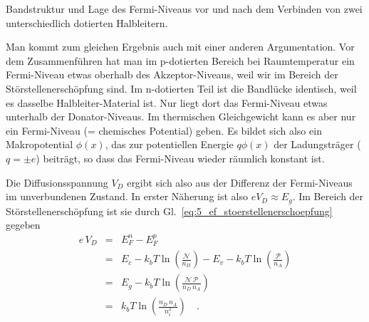 \begin{marginfigure}
    \caption{Bandstruktur und Lage des Fermi-Niveaus vor und nach dem Verbinden  von zwei unterschiedlich dotierten Halbleitern.}
\end{marginfigure}

Man kommt zum gleichen Ergebnis auch mit einer anderen Argumentation. Vor dem Zusammenführen hat man im p-dotierten Bereich bei Raumtemperatur ein Fermi-Niveau etwas oberhalb des Akzeptor-Niveaus, weil wir im Bereich der Störstellenerschöpfung sind. Im n-dotierten Teil ist die Bandlücke identisch, weil es dasselbe Halbleiter-Material ist. Nur liegt dort das Fermi-Niveau  etwas unterhalb der Donator-Niveaus. Im thermischen Gleichgewicht kann es aber nur ein Fermi-Niveau (= chemisches Potential) geben. Es bildet sich also ein Makropotential $\phi(x)$, das zur potentiellen Energie $q \phi(x)$ der Ladungsträger ($q = \pm e$) beiträgt, so dass das Fermi-Niveau wieder räumlich konstant ist. 


Die Diffusionsspannung $V_D$ ergibt sich also aus der Differenz der Fermi-Niveaus im unverbundenen Zustand. In erster Näherung ist also $e V_D \approx E_g$. Im Bereich der Störstellenerschöpfung ist sie durch Gl.~\ref{eq:5_ef_stoerstellenerschoepfung} gegeben
\begin{eqnarray}
    e \, V_D &= & E_F^n - E_F^p \\
    & =&   E_c - k_b T \ln \left( \frac{\mathcal{N}}{n_D} \right) - 
    E_v - k_b T \ln \left( \frac{\mathcal{P}}{n_A} \right) \\
   & =& E_g -  k_b T \ln \left( \frac{\mathcal{N \, P}}{n_D \, n_A} \right) \\
   & = & k_b T \ln \left( \frac{n_D \, n_A}{n_i^2} \right)  \quad .
\end{eqnarray}

